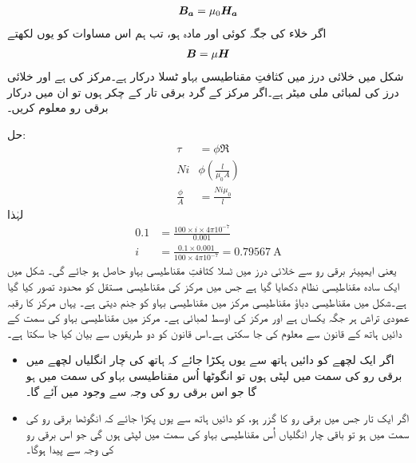 \begin{align}
{\ensuremath{{\boldsymbol{B_a}}}}=\mu_0 {{\boldsymbol{H_a}}}
\end{align}
اگر خلاء کی جگہ کوئی اور مادہ ہو، تب ہم اس مساوات کو یوں لکھتے
\begin{align}
{\ensuremath{{\boldsymbol{B}}}}=\mu {\ensuremath{{\boldsymbol{H}}}}
\end{align}
%
شکل  میں خلائی درز میں کثافتِ مقناطیسی بہاو  ٹسلا درکار ہے۔مرکز کی   ہے اور خلائی درز کی لمبائی  ملی میٹر ہے۔اگر  مرکز کے گرد برقی تار کے  چکر ہوں تو ان میں درکار برقی رو معلوم کریں۔

حل:
\begin{align*}
\tau&=\phi \Re\\
N i & \phi \left(\frac{l}{\mu_0 A} \right)\\
\frac{\phi}{A}&=\frac{ N i \mu_0}{l}
\end{align*}
لہٰذا
\begin{align*}
0.1&=\frac{100 \times i \times 4 \pi  10^{-7}}{0.001}\\
i&=\frac{0.1 \times 0.001}{100 \times 4 \pi  10^{-7}}=\SI{0.79567}{\ampere}
\end{align*}
یعنی  ایمپیئر برقی رو سے خلائی درز میں  ٹسلا کثافتِ مقناطیسی بہاو حاصل ہو جائے گی۔
%
شکل  میں ایک سادہ مقناطیسی نظام دکھایا گیا ہے جس میں مرکز کی مقناطیسی مستقل کو محدود تصور کیا گیا ہے۔شکل میں مقناطیسی دباؤ   مقناطیسی مرکز میں مقناطیسی بہاو  کو جنم دیتی ہے۔ یہاں مرکز کا رقبہ عمودی تراش   ہر جگہ یکساں ہے اور مرکز  کی اوسط لمبائی  ہے۔ مرکز میں مقناطیسی بہاو  کی سمت  کے دائیں ہاتھ کے قانون  سے معلوم کی جا سکتی ہے۔اس قانون کو دو طریقوں سے بیان کیا جا سکتا ہے۔
\begin{itemize}
\item
اگر ایک لچھے کو دائیں ہاتھ سے یوں پکڑا  جائے کہ ہاتھ کی چار انگلیاں لچھے میں برقی رو کی سمت میں لپٹی  ہوں تو انگوٹھا اُس مقناطیسی بہاو کی سمت میں ہو گا جو اس برقی رو کی وجہ سے وجود میں آئے گا۔
\item
اگر ایک تار جس میں برقی رو کا گزر ہو، کو دائیں ہاتھ سے یوں پکڑا جائے کہ انگوٹھا  برقی رو  کی سمت میں ہو تو باقی چار انگلیاں اُس مقناطیسی  بہاو کی سمت میں لپٹی ہوں گی  جو اس برقی رو کی وجہ سے  پیدا ہوگا۔
\end{itemize}


